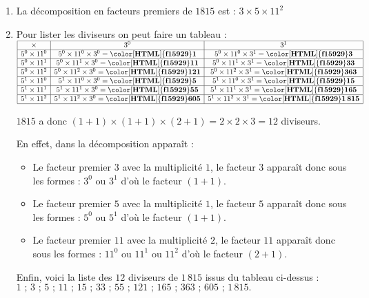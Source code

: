 
    \begin{enumerate}
        \item La décomposition en facteurs premiers de $\num{1815}$ est : $3\times 5\times 11^{2}$
        \item Pour lister les diviseurs on peut faire un tableau :
        $\renewcommand{\arraystretch}{1}
        \begin{array}{|c|c|c|}
        \hline
        \times & 3^{0} & 3^{1}\\
        \hline
        5^{0}\times11^{0} & 5^{0}\times11^{0}\times3^{0}=\mathbf{{\color[HTML]{f15929}1}} & 5^{0}\times11^{0}\times3^{1}=\mathbf{{\color[HTML]{f15929}3}}\\
        \hline
        5^{0}\times11^{1} & 5^{0}\times11^{1}\times3^{0}=\mathbf{{\color[HTML]{f15929}11}} & 5^{0}\times11^{1}\times3^{1}=\mathbf{{\color[HTML]{f15929}33}}\\
        \hline
        5^{0}\times11^{2} & 5^{0}\times11^{2}\times3^{0}=\mathbf{{\color[HTML]{f15929}121}} & 5^{0}\times11^{2}\times3^{1}=\mathbf{{\color[HTML]{f15929}363}}\\
        \hline
        5^{1}\times11^{0} & 5^{1}\times11^{0}\times3^{0}=\mathbf{{\color[HTML]{f15929}5}} & 5^{1}\times11^{0}\times3^{1}=\mathbf{{\color[HTML]{f15929}15}}\\
        \hline
        5^{1}\times11^{1} & 5^{1}\times11^{1}\times3^{0}=\mathbf{{\color[HTML]{f15929}55}} & 5^{1}\times11^{1}\times3^{1}=\mathbf{{\color[HTML]{f15929}165}}\\
        \hline
        5^{1}\times11^{2} & 5^{1}\times11^{2}\times3^{0}=\mathbf{{\color[HTML]{f15929}605}} & 5^{1}\times11^{2}\times3^{1}=\mathbf{{\color[HTML]{f15929}1\,815}}\\
        \hline
        \end{array}
        \renewcommand{\arraystretch}{1}$

        $\num{1815}$ a donc $(1+1)\times(1+1)\times(2+1) = 2\times2\times3 = 12$ diviseurs.

        En effet, dans la décomposition apparaît :
        \begin{itemize}
            \item Le facteur premier $3$ avec la multiplicité $1$, le facteur $3$ apparaît donc sous les formes : $3^{0}$ ou $3^{1}$ d'où le facteur $(1+1)$.
            \item Le facteur premier $5$ avec la multiplicité $1$, le facteur $5$ apparaît donc sous les formes : $5^{0}$ ou $5^{1}$ d'où le facteur $(1+1)$.
            \item Le facteur premier $11$ avec la multiplicité $2$, le facteur $11$ apparaît donc sous les formes : $11^{0}$ ou $11^{1}$ ou $11^{2}$ d'où le facteur $(2+1)$.
        \end{itemize}

        Enfin, voici la liste des $12$ diviseurs de $1\,815$ issus du tableau ci-dessus : $1\text{ ; }3\text{ ; }5\text{ ; }11\text{ ; }15\text{ ; }33\text{ ; }55\text{ ; }121\text{ ; }165\text{ ; }363\text{ ; }605\text{ ; }1\,815.$
    \end{enumerate}

